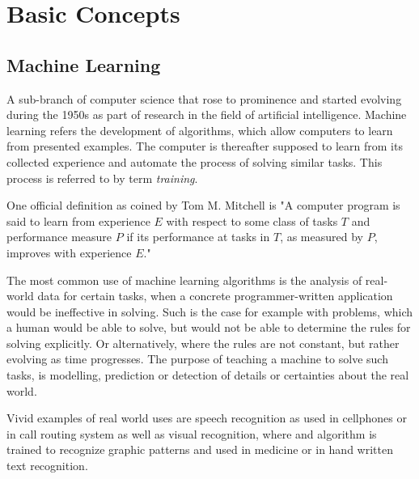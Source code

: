 \section{Basic Concepts}
	\subsection{Machine Learning}
		A sub-branch of computer science that rose to prominence and started evolving during the 1950s as part of research in the field of artificial intelligence. Machine learning refers the development of algorithms, which allow computers to learn from presented examples. The computer is thereafter supposed to learn from its collected experience and automate the process of solving similar tasks. This process is referred to by term \textit{training}.
		\par
		One official definition as coined by Tom M. Mitchell \cite{mitchell} is  "A computer program is said to learn from experience $E$ with respect to some class of tasks $ T $ and performance measure $ P $ if its performance at tasks in $ T $, as measured by $ P $, improves with experience $ E $."
		\par
		The most common use of machine learning algorithms is the analysis of real-world data for certain tasks, when a concrete programmer-written application would be ineffective in solving. Such is the case for example with problems, which a human would be able to solve, but would not be able to determine the rules for solving explicitly. Or alternatively, where the rules are not constant, but rather evolving as time progresses. The purpose of teaching a machine to solve such tasks, is modelling, prediction or detection of details or certainties about the real world. 
		\par
		Vivid examples of real world uses are speech recognition as used in cellphones or in 
		call routing system as well as visual recognition, where and algorithm is trained to recognize graphic patterns and used in medicine or in hand written text recognition.
		
